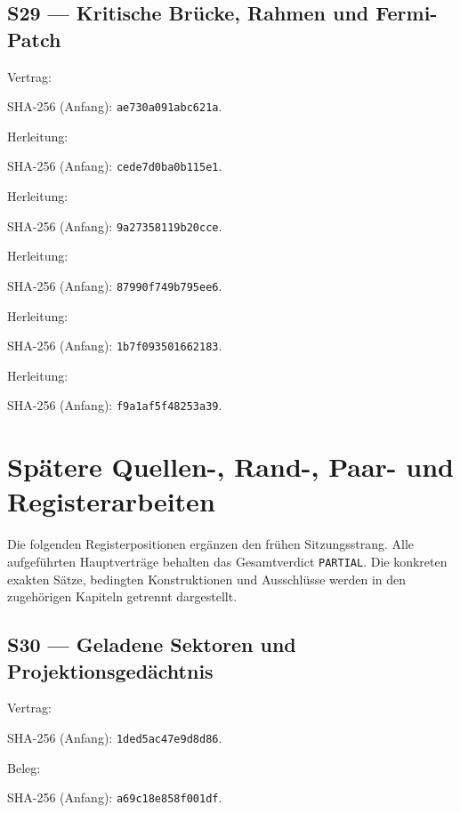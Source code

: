 \subsection*{S29 — Kritische Brücke, Rahmen und Fermi-Patch}\label{s:29}
{\small{}\par}
Vertrag: \par{\footnotesize SHA-256 (Anfang): \texttt{ae730a091abc621a}.}\par
Herleitung: \par{\footnotesize SHA-256 (Anfang): \texttt{cede7d0ba0b115e1}.}\par
Herleitung: \par{\footnotesize SHA-256 (Anfang): \texttt{9a27358119b20cce}.}\par
Herleitung: \par{\footnotesize SHA-256 (Anfang): \texttt{87990f749b795ee6}.}\par
Herleitung: \par{\footnotesize SHA-256 (Anfang): \texttt{1b7f093501662183}.}\par
Herleitung: \par{\footnotesize SHA-256 (Anfang): \texttt{f9a1af5f48253a39}.}\par
\section{Spätere Quellen-, Rand-, Paar- und Registerarbeiten}
Die folgenden Registerpositionen ergänzen den frühen Sitzungsstrang. Alle aufgeführten Hauptverträge behalten das Gesamtverdict \texttt{PARTIAL}. Die konkreten exakten Sätze, bedingten Konstruktionen und Ausschlüsse werden in den zugehörigen Kapiteln getrennt dargestellt.
\subsection*{S30 — Geladene Sektoren und Projektionsgedächtnis}\label{s:30}
{\small{}\par}
Vertrag: \par
{\footnotesize SHA-256 (Anfang): \texttt{1ded5ac47e9d8d86}.}\par
Beleg: \par
{\footnotesize SHA-256 (Anfang): \texttt{a69c18e858f001df}.}\par
